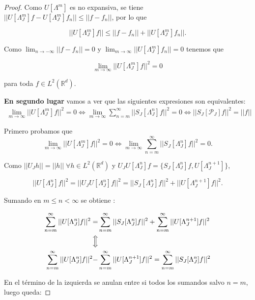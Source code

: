 \begin{proof}
  \medskip

  \noindent Como $U[\Lambda^m]$ es no expansiva, se tiene $||U[\Lambda_J^m]f-U[\Lambda_J^m]f_n|| \leq ||f - f_n||$, por lo que 

  $$||U[\Lambda_J^m]f|| \leq || f-f_n|| + ||U[\Lambda_J^m]f_n||.$$

  \noindent Como $\lim_{n\rightarrow -\infty}||f-f_n||=0$ y $\lim_{m\rightarrow\infty}||U[\Lambda_J^m]f_n||=0$ tenemos que 

  $$\lim_{m\rightarrow\infty} ||U[\Lambda_J^m]f||^2=0$$

  \noindent para toda $f \in L^2(\mathbb{R}^d)$. 

  \medskip

  \noindent \textbf{En segundo lugar} vamos a ver que las siguientes expresiones son equivalentes: 
  \begin{align*}
    \lim_{m\rightarrow \infty} ||U[\Lambda_J^m]f||^2=0 \iff \lim_{m\rightarrow\infty} \sum_{n=m}^{\infty} ||S_J[\Lambda_J^n]f||^2=0 \iff ||S_J[\mathcal{P}_J]f||^2 = ||f||
  \end{align*}

  \noindent Primero probamos que 
  $$\lim_{m\rightarrow \infty} ||U[\Lambda_J^m]f||^2=0 \iff \lim_{m\rightarrow\infty} \sum_{n=m}^{\infty} ||S_J[\Lambda_J^n]f||^2=0.$$
  
  \noindent Como $||U_J h||=||h|| \; \forall h \in L^2(\mathbb{R}^d)$ y $U_J U[\Lambda_J^n]f=\lbrace S_J[\Lambda_J^n]f,U[\Lambda_J^{n+1}]\rbrace$,

 \begin{equation} \label{eq::1.8}
  ||U[\Lambda_J^n]f||^2=||U_JU[\Lambda_J^n]f||^2=||S_J[\Lambda_J^n]f||^2+||U[\Lambda_J^{n+1}]f||^2. 
 \end{equation}

  \noindent Sumando en $m\leq n < \infty$ se obtiene : 
  
  \begin{align*}
    \sum_{n=m}^\infty ||U[\Lambda_J^n]f||^2=&\sum_{n=m}^\infty ||S_J[\Lambda_J^n]f||^2 + \sum_{n=m}^\infty||U[\Lambda_J^{n+1}]f||^2 \\
    \Big\Updownarrow \\
    \sum_{n=m}^\infty ||U[\Lambda_J^n]f||^2 -& \sum_{n=m}^\infty||U[\Lambda_J^{n+1}]f||^2 =\sum_{n=m}^\infty ||S_J[\Lambda_J^n]f||^2  \\
  \end{align*}
  
  \noindent En el término de la izquierda se anulan entre si todos los sumandos salvo $n=m$, luego queda: 


\end{proof}

